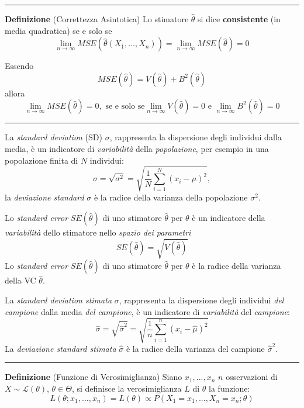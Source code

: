 \documentclass[
  11pt,
]{book}
\theoremstyle{mytheoremstyle}
\theoremstyle{mydefstyle}
\begin{document}
\begin{center}\rule{0.5\linewidth}{0.5pt}\end{center}

\textbf{Definizione} (Correttezza Asintotica)
Lo stimatore \(\hat\theta\) si dice \textbf{consistente} (in media quadratica) se e solo se
\[\lim_{n\to\infty}MSE(\hat\theta(X_1,...,X_n))=\lim_{n\to\infty}MSE(\hat\theta)=0\]

Essendo
\[MSE(\hat\theta)=V(\hat\theta)+B^2(\hat\theta)\]
allora
\[\lim_{n\to\infty} MSE(\hat\theta)=0, \text{ se e solo se} \lim_{n\to\infty} V(\hat\theta)=0 \text{ e } \lim_{n\to\infty} B^2(\hat\theta)=0\]

\begin{center}\rule{0.5\linewidth}{0.5pt}\end{center}

La \emph{standard deviation} (SD) \(\sigma\), rappresenta la dispersione degli individui dalla media, è un indicatore di \emph{variabilità} della \emph{popolazione}, per esempio in una popolazione finita di \(N\) individui:
\[\sigma=\sqrt{\sigma^2}=\sqrt{\frac 1 N\sum_{i=1}^N(x_i-\mu)^2},\]
la \emph{deviazione standard} \(\sigma\) è la radice della varianza della popolazione \(\sigma^2\).

Lo \emph{standard error} \(SE(\hat\theta)\) di uno stimatore \(\hat\theta\) per \(\theta\) è un indicatore della \emph{variabilità} dello stimatore nello \emph{spazio dei parametri}
\[SE(\hat\theta)=\sqrt{V(\hat\theta)}\]
Lo \emph{standard error} \(SE(\hat\theta)\) di uno stimatore \(\hat\theta\) per \(\theta\) è la radice della varianza della VC \(\hat\theta\).

La \emph{standard deviation stimata} \(\sigma\), rappresenta la dispersione degli individui \emph{del campione} dalla media \emph{del campione}, è un indicatore di \emph{variabilità} del \emph{campione}:
\[\hat\sigma=\sqrt{\hat\sigma^2}=\sqrt{\frac 1 n\sum_{i=1}^n(x_i-\hat\mu)^2}\]
La \emph{deviazione standard stimata} \(\hat\sigma\) è la radice della varianza del campione \(\hat\sigma^2\).

\begin{center}\rule{0.5\linewidth}{0.5pt}\end{center}

\textbf{Definizione} (Funzione di Verosimiglianza)
Siano \(x_1,...,x_n\) \(n\) osservazioni di \(X\sim \mathscr{L}(\theta)\), \(\theta\in\Theta\), si definisce la verosimiglianza \(L\) di \(\theta\) la funzione:
\[L(\theta;x_1,...,x_n)=L(\theta)\propto P(X_1=x_1,...,X_n=x_n;\theta)\]
\end{document}
